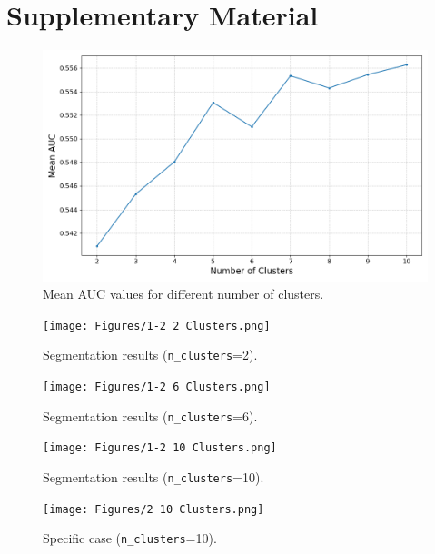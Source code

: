 \documentclass[final]{article}
\begin{document}
\section{Supplementary Material}
\setcounter{figure}{0}
\renewcommand{\thefigure}{S\arabic{figure}}

\begin{figure}[H]
    \centering
    \includegraphics[scale=0.5]{Figures/1-1 Find the Best n_clusters.png}
    \vspace{-0.25cm}
    \caption{Mean AUC values for different number of clusters.}
    \label{fig:nclusters}
\end{figure}
\begin{figure}[H]
    \centering
    \texttt{[image: Figures/1-2 2 Clusters.png]}
    \vspace{-0.25cm}
    \caption{Segmentation results (\texttt{n\_clusters}=2).}
    \label{fig:n=2}
\end{figure}
\begin{figure}[H]
    \centering
    \texttt{[image: Figures/1-2 6 Clusters.png]}
    \vspace{-0.25cm}
    \caption{Segmentation results (\texttt{n\_clusters}=6).}
    \label{fig:n=6}
\end{figure}
\begin{figure}[H]
    \centering
    \texttt{[image: Figures/1-2 10 Clusters.png]}
    \vspace{-0.25cm}
    \caption{Segmentation results (\texttt{n\_clusters}=10).}
    \label{fig:n=10}
\end{figure}
\begin{figure}[H]
    \centering
    \texttt{[image: Figures/2 10 Clusters.png]}
    \vspace{-0.25cm}
    \caption{Specific case (\texttt{n\_clusters}=10).}
    \label{fig:specificcase}
\end{figure}
\end{document}
